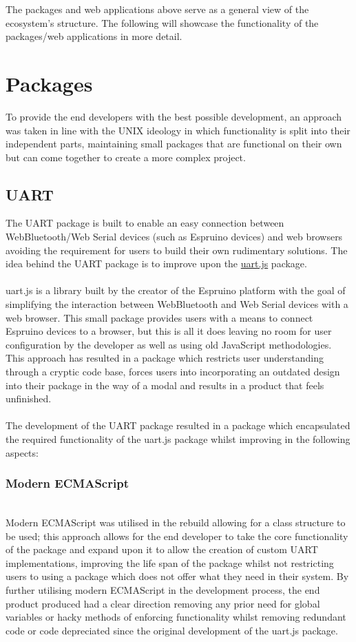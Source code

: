 \documentclass{l4proj}
\begin{document}
The packages and web applications above serve as a general view of the ecosystem's structure. The following will showcase the functionality of the packages/web applications in more detail.

\section{Packages}

To provide the end developers with the best possible development, an approach was taken in line with the UNIX ideology \cite{TheArtOfUNIXProgramming} in which functionality is split into their independent parts, maintaining small packages that are functional on their own but can come together to create a more complex project.

\subsection{UART}

The UART package is built to enable an easy connection between WebBluetooth/Web Serial devices (such as Espruino devices) and web browsers avoiding the requirement for users to build their own rudimentary solutions. The idea behind the UART package is to improve upon the \href{https://www.espruino.com/UART.js}{uart.js} package. 
\\ \\
uart.js is a library built by the creator of the Espruino platform with the goal of simplifying the interaction between WebBluetooth and Web Serial devices with a web browser. This small package provides users with a means to connect Espruino devices to a browser, but this is all it does leaving no room for user configuration by the developer as well as using old JavaScript methodologies. This approach has resulted in a package which restricts user understanding through a cryptic code base, forces users into incorporating an outdated design into their package in the way of a modal and results in a product that feels unfinished.
\\ \\
The development of the UART package resulted in a package which encapsulated the required functionality of the uart.js package whilst improving in the following aspects: 
\\  
\subsubsection{Modern ECMAScript}\hfill\\
Modern ECMAScript was utilised in the rebuild allowing for a class structure to be used; this approach allows for the end developer to take the core functionality of the package and expand upon it to allow the creation of custom UART implementations, improving the life span of the package whilst not restricting users to using a package which does not offer what they need in their system. By further utilising modern ECMAScript in the development process, the end product produced had a clear direction removing any prior need for global variables or hacky methods of enforcing functionality whilst removing redundant code or code depreciated since the original development of the uart.js package.
\\
\end{document}
